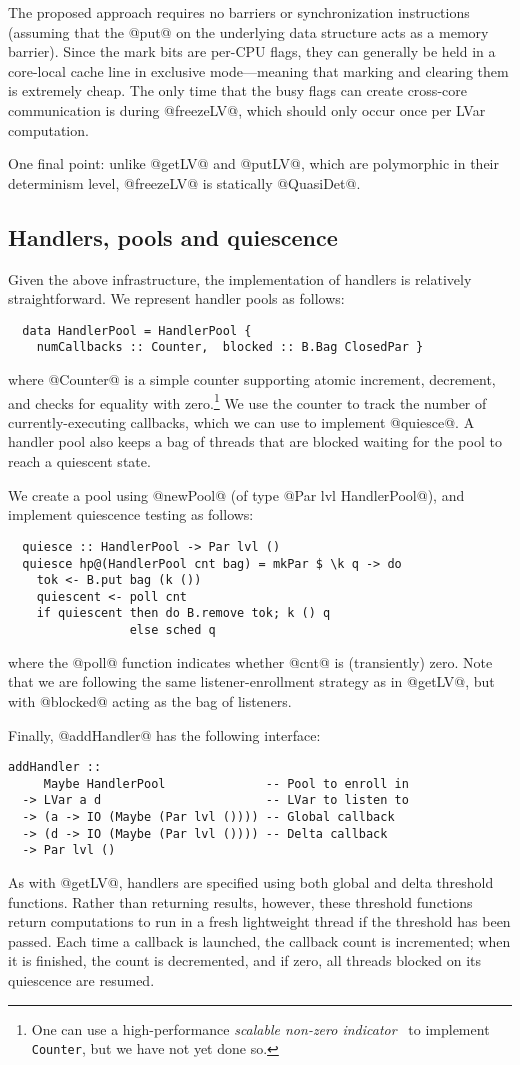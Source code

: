 The proposed approach requires no barriers or synchronization instructions
(assuming that the @put@ on the underlying data structure acts as a memory barrier).
Since the mark bits are per-CPU flags, they can generally be held in a
core-local cache line in exclusive mode---meaning that marking and clearing them
is extremely cheap.  The only time that the busy flags can create cross-core
communication is during @freezeLV@, which should only occur once per LVar
computation.

One final point: unlike @getLV@ and @putLV@, which are polymorphic in their
determinism level, @freezeLV@ is statically @QuasiDet@.

\subsection{Handlers, pools and quiescence}

Given the above infrastructure, the implementation of handlers is relatively straightforward.
We represent handler pools as follows:
\begin{lstlisting}
  data HandlerPool = HandlerPool {
    numCallbacks :: Counter,  blocked :: B.Bag ClosedPar }
\end{lstlisting}
where @Counter@ is a simple counter supporting atomic increment, decrement, and
checks for equality with zero.\footnote{One can use a high-performance
  \emph{scalable non-zero indicator}~\cite{snzi} to implement \texttt{Counter}, but we
  have not yet done so.}  We use the counter to track the number of
currently-executing callbacks, which we can use to implement @quiesce@.  A
handler pool also keeps a bag of threads that are blocked waiting for the pool
to reach a quiescent state.

We create a pool using @newPool@ (of type @Par lvl HandlerPool@), 
and implement quiescence testing as follows:
\begin{lstlisting}
  quiesce :: HandlerPool -> Par lvl ()
  quiesce hp@(HandlerPool cnt bag) = mkPar $ \k q -> do
    tok <- B.put bag (k ())
    quiescent <- poll cnt
    if quiescent then do B.remove tok; k () q
                 else sched q
\end{lstlisting} %
where the @poll@ function indicates whether @cnt@ is (transiently) zero.  Note
that we are following the same listener-enrollment strategy as in @getLV@, but
with @blocked@ acting as the bag of listeners.

Finally, @addHandler@ has the following interface:
\begin{lstlisting}
addHandler :: 
     Maybe HandlerPool              -- Pool to enroll in
  -> LVar a d                       -- LVar to listen to
  -> (a -> IO (Maybe (Par lvl ()))) -- Global callback
  -> (d -> IO (Maybe (Par lvl ()))) -- Delta callback
  -> Par lvl ()
\end{lstlisting}
As with @getLV@, handlers are specified using both global and delta
threshold functions.  Rather than returning results, however, these threshold
functions return computations to run in a fresh lightweight thread if the
threshold has been passed.  Each time a callback is launched, the callback count
is incremented; when it is finished, the count is decremented, and if zero, all
threads blocked on its quiescence are resumed.

